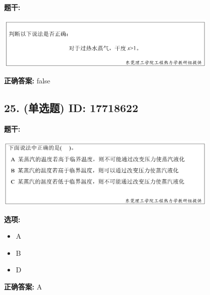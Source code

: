 \documentclass[12pt]{article}
\begin{document}
\textbf{题干:}


\begin{center}\includegraphics[width=0.8\textwidth, height=0.25\textheight, keepaspectratio]{question_24_17718628/title_img_1.png}\end{center}

\textbf{正确答案:}
false

\vspace{0.5em}\hrulefill\vspace{1em}

\subsection*{25. (单选题) \small ID: 17718622}

\textbf{题干:}


\begin{center}\includegraphics[width=0.8\textwidth, height=0.25\textheight, keepaspectratio]{question_25_17718622/title_img_1.png}\end{center}

\textbf{选项:}
\begin{itemize}[leftmargin=*]
  \item A

  \item B

  \item D

\end{itemize}

\textbf{正确答案:}
A

\vspace{0.5em}\hrulefill\vspace{1em}
\end{document}
